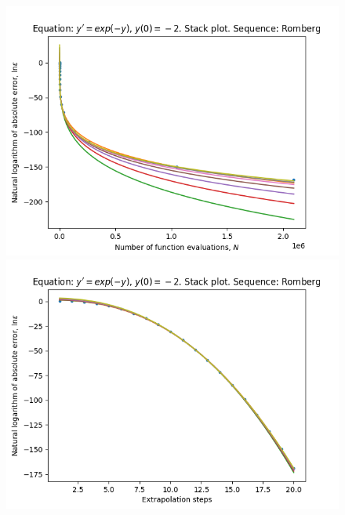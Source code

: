 \begin{figure}[H]
\centering
\begin{minipage}{0.45\textwidth}
\centering
\includegraphics[scale=0.45]{../results/emr_plots/ln_em2_hp_romberg_stack.png}
\end{minipage}
\begin{minipage}{0.45\textwidth}
\centering
\includegraphics[scale=0.45]{../results/emr_plots/ln_em2_hp_romberg_steps_stack.png}
\end{minipage}
\end{figure}

